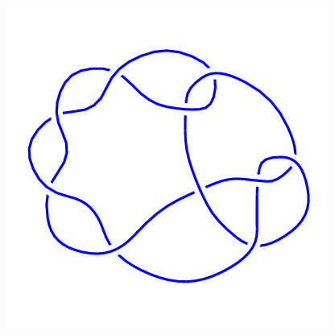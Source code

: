 \begin{figure}[H]
\begin{minipage}[b]{.18\linewidth}
    \end{minipage}
    \begin{minipage}[b]{.18\linewidth}
        \centering
        \includegraphics[width=\linewidth]{../data/10_36.png}
    \end{minipage}
\end{figure}
